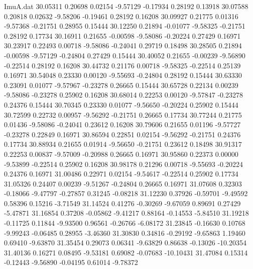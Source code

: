 \begin{filecontents}{ImuA.dat}
  30.05311    0.20698    0.02154   -9.57129   -0.17934    0.28192    0.13918
  30.07588    0.20818    0.02632   -9.58206   -0.19461    0.28192    0.16208
  30.09927    0.21775    0.01316   -9.57368   -0.21751    0.28955    0.15444
  30.12250    0.21894   -0.01077   -9.58325   -0.21751    0.28192    0.17734
  30.16911    0.21655   -0.00598   -9.58086   -0.20224    0.27429    0.16971
  30.23917    0.22493    0.00718   -9.58086   -0.24041    0.29719    0.18498
  30.28505    0.21894   -0.00598   -9.57129   -0.24804    0.27429    0.15444
  30.40052    0.21655   -0.00239   -9.56890   -0.22514    0.28192    0.16208
  30.44732    0.21176    0.00718   -9.58325   -0.22514    0.25139    0.16971
  30.54048    0.23330    0.00120   -9.55693   -0.24804    0.28192    0.15444
  30.63330    0.23091    0.01077   -9.57967   -0.23278    0.26665    0.15444
  30.65728    0.22134    0.00239   -9.58086   -0.23278    0.25902    0.16208
  30.68014    0.22253    0.00120   -9.57847   -0.23278    0.24376    0.15444
  30.70345    0.23330    0.01077   -9.56650   -0.20224    0.25902    0.15444
  30.72599    0.22732    0.00957   -9.56292   -0.21751    0.26665    0.17734
  30.77244    0.21775    0.01436   -9.58086   -0.24041    0.23612    0.16208
  30.79606    0.21655    0.01196   -9.57727   -0.23278    0.22849    0.16971
  30.86594    0.22851    0.02154   -9.56292   -0.21751    0.24376    0.17734
  30.88934    0.21655    0.01914   -9.56650   -0.21751    0.23612    0.18498
  30.91317    0.22253    0.00837   -9.57009   -0.20988    0.26665    0.16971
  30.95860    0.22373    0.00000   -9.53899   -0.22514    0.25902    0.16208
  30.98178    0.21296    0.00718   -9.55693   -0.20224    0.24376    0.16971
  31.00486    0.22971    0.02154   -9.54617   -0.22514    0.25902    0.17734
  31.05326    0.24407    0.00239   -9.51267   -0.24804    0.26665    0.16971
  31.07608    0.32303   -0.18066   -9.47797   -0.27857    0.31245   -0.08218
  31.12230    0.37926   -0.59701   -9.49592    0.58396    0.15216   -3.71549
  31.14524    0.41276   -0.30269   -9.67059    0.89691    0.27429   -5.47871
  31.16854    0.37208   -0.05862   -9.41217    0.88164   -0.14553   -5.84510
  31.19218   -0.11725    0.11844   -9.93500    0.96561   -0.26766   -6.08172
  31.23845   -0.16630    0.10768   -9.99243   -0.06485    0.28955   -3.46360
  31.30830    0.34816   -0.29192   -9.65863    1.19460    0.69410   -9.63870
  31.35454    0.29073    0.06341   -9.63829    0.86638   -0.13026  -10.20354
  31.40136    0.16271    0.08495   -9.53181    0.69082   -0.07683  -10.10431
  31.47084    0.15314   -0.12443   -9.56890   -0.04195    0.61014   -9.78372

\end{filecontents}
